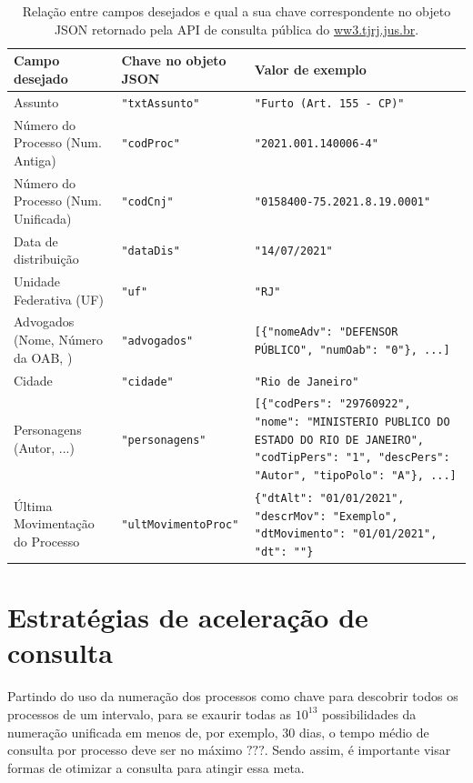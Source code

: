 \begin{table}[htb]
    \tiny
    \centering
    \begin{tabular}{llp{}}
        \toprule
        Campo desejado & Chave no objeto JSON & Valor de exemplo \\
        \midrule
        Assunto & \texttt{"txtAssunto"} & \texttt{"Furto  (Art. 155 - CP)"} \\
        Número do Processo (Num. Antiga) & \texttt{"codProc"} & \texttt{"2021.001.140006-4"} \\
        Número do Processo (Num. Unificada) & \texttt{"codCnj"} & \texttt{"0158400-75.2021.8.19.0001"} \\
        Data de distribuição & \texttt{"dataDis"} & \texttt{"14/07/2021"} \\
        Unidade Federativa (UF) & \texttt{"uf"} & \texttt{"RJ"} \\
        Advogados (Nome, Número da OAB, ) & \texttt{"advogados"} & \texttt{[\{"nomeAdv": "DEFENSOR PÚBLICO", "numOab": "0"\}, ...]} \\
        Cidade & \texttt{"cidade"} & \texttt{"Rio de Janeiro"} \\
        Personagens (Autor, ...) & \texttt{"personagens"} & \texttt{[\{"codPers": "29760922", "nome": "MINISTERIO PUBLICO DO ESTADO DO RIO DE JANEIRO", "codTipPers": "1", "descPers": "Autor", "tipoPolo": "A"\}, ...]} \\
        Última Movimentação do Processo & \texttt{"ultMovimentoProc"} & \texttt{\{"dtAlt": "01/01/2021", "descrMov": "Exemplo", "dtMovimento": "01/01/2021", "dt": ""\}} \\
        \bottomrule
    \end{tabular}
    \caption{%
        Relação entre campos desejados e qual a sua chave correspondente no
        objeto JSON retornado pela API de consulta pública do
        \url{ww3.tjrj.jus.br}.
    }
    \label{tbl:relação-chaves-campos-json}
\end{table}


\section{Estratégias de aceleração de consulta}

Partindo do uso da numeração dos processos como chave para descobrir todos os
processos de um intervalo, para se exaurir todas as $10^{13}$ possibilidades da
numeração unificada em menos de, por exemplo, 30 dias, o tempo médio de
consulta por processo deve ser no máximo $???$. Sendo assim, é importante visar
formas de otimizar a consulta para atingir essa meta.

